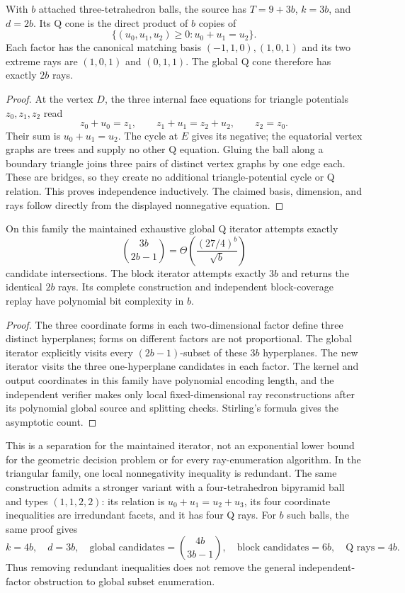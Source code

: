 \begin{proposition}
\label{sec:sector-bipyramid}
With $b$ attached three-tetrahedron balls, the source has $T=9+3b$,
$k=3b$, and $d=2b$.  Its Q cone is the direct product of $b$ copies of
\[
 \{(u_0,u_1,u_2)\geq0:u_0+u_1=u_2\}.
\]
Each factor has the canonical matching basis
$(-1,1,0),(1,0,1)$ and its two extreme rays are
$(1,0,1)$ and $(0,1,1)$.  The global Q cone therefore has exactly $2b$ rays.
\end{proposition}
\begin{proof}
At the vertex $D$, the three internal face equations for triangle
potentials $z_0,z_1,z_2$ read
\[
 z_0+u_0=z_1,\qquad z_1+u_1=z_2+u_2,\qquad z_2=z_0.
\]
Their sum is $u_0+u_1=u_2$.  The cycle at $E$ gives its negative;
the equatorial vertex graphs are trees and supply no other Q equation.
Gluing the ball along a boundary triangle joins three pairs of distinct
vertex graphs by one edge each.  These are bridges, so they create no
additional triangle-potential cycle or Q relation.  This proves independence
inductively.  The claimed basis, dimension, and rays follow directly from
the displayed nonnegative equation.
\end{proof}

\begin{corollary}
\label{sec:sector-separation}
On this family the maintained exhaustive global Q iterator attempts exactly
\[
 \binom{3b}{2b-1}
       =\Theta\!\left(\frac{(27/4)^b}{\sqrt b}\right)
\]
candidate intersections.  The block iterator attempts exactly $3b$ and
returns the identical $2b$ rays.  Its complete construction and independent
block-coverage replay have polynomial bit complexity in $b$.
\end{corollary}
\begin{proof}
The three coordinate forms in each two-dimensional factor define three
distinct hyperplanes; forms on different factors are not proportional.
The global iterator explicitly visits every $(2b-1)$-subset of these $3b$
hyperplanes.  The new iterator visits the three one-hyperplane candidates
in each factor.  The kernel and output coordinates in this family have
polynomial encoding length, and the independent verifier makes only local
fixed-dimensional ray reconstructions after its polynomial global source
and splitting checks.  Stirling's formula gives the asymptotic count.
\end{proof}

This is a separation for the maintained iterator, not an exponential lower
bound for the geometric decision problem or for every ray-enumeration
algorithm.  In the triangular family, one local nonnegativity inequality
is redundant.  The same construction admits a stronger variant with a
four-tetrahedron bipyramid ball and types $(1,1,2,2)$: its relation is
$u_0+u_1=u_2+u_3$, its four coordinate inequalities are irredundant facets,
and it has four Q rays.  For $b$ such balls, the same proof gives
\[
 k=4b,\quad d=3b,\quad
 \text{global candidates}=\binom{4b}{3b-1},\quad
 \text{block candidates}=6b,\quad \text{Q rays}=4b.
\]
Thus removing redundant inequalities does not remove the general
independent-factor obstruction to global subset enumeration.

